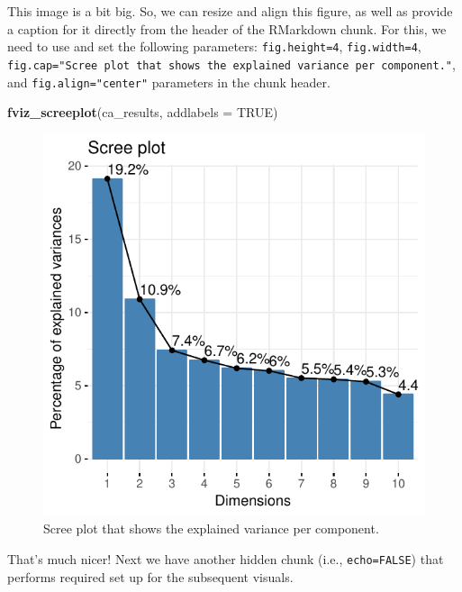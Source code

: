 \documentclass[]{article}
\newenvironment{Shaded}{\begin{snugshade}}{\end{snugshade}}
\newcommand{\DataTypeTok}[1]{\textcolor[rgb]{0.13,0.29,0.53}{#1}}
\newcommand{\KeywordTok}[1]{\textcolor[rgb]{0.13,0.29,0.53}{\textbf{#1}}}
\newcommand{\NormalTok}[1]{#1}
\newcommand{\OtherTok}[1]{\textcolor[rgb]{0.56,0.35,0.01}{#1}}
\begin{document}
This image is a bit big. So, we can resize and align this figure, as
well as provide a caption for it directly from the header of the
RMarkdown chunk. For this, we need to use and set the following
parameters: \texttt{fig.height=4}, \texttt{fig.width=4},
\texttt{fig.cap="Scree\ plot\ that\ shows\ the\ explained\ variance\ per\ component."},
and \texttt{fig.align="center"} parameters in the chunk header.

\begin{Shaded}
\begin{Highlighting}[]
\KeywordTok{fviz_screeplot}\NormalTok{(ca_results, }\DataTypeTok{addlabels =} \OtherTok{TRUE}\NormalTok{)}
\end{Highlighting}
\end{Shaded}

\begin{figure}[H]

{\centering \includegraphics{1_a_Simple_RMarkdown_PDF_files/figure-latex/visualize_ca_scree_chunk_parameters-1} 

}

\caption{Scree plot that shows the explained variance per component.}\label{fig:visualize_ca_scree_chunk_parameters}
\end{figure}

That's much nicer! Next we have another hidden chunk (i.e.,
\texttt{echo=FALSE}) that performs required set up for the subsequent
visuals.
\end{document}
